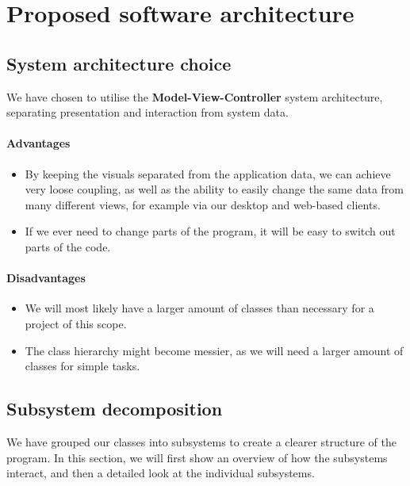 \chapter{Proposed software architecture}
\label{sec:Proposed software architecture}






\section{System architecture choice}
We have chosen to utilise the \textbf{Model-View-Controller} system architecture, separating presentation and interaction from system data. 

\subsubsection{Advantages}
\begin{itemize}
	\item By keeping the visuals separated from the application data, we can achieve very loose coupling, as well as the ability to easily change the same data from many different views, for example via our desktop and web-based clients. \\
	\item If we ever need to change parts of the program, it will be easy to switch out parts of the code.
\end{itemize}


\subsubsection{Disadvantages}
\begin{itemize}
	\item We will most likely have a larger amount of classes than necessary for a project of this scope. \\
	\item The class hierarchy might become messier, as we will need a larger amount of classes for simple tasks.
\end{itemize}


\section{Subsystem decomposition}
We have grouped our classes into subsystems to create a clearer structure of the program. In this section, we will first show an overview of how the subsystems interact, and then a detailed look at the individual subsystems.

